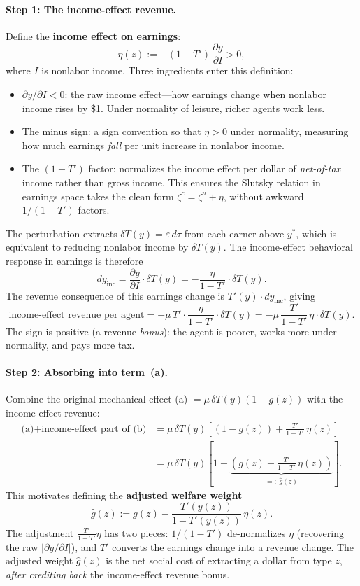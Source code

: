 \documentclass[12pt,a4paper]{article}
\theoremstyle{definition}
\theoremstyle{plain}
\theoremstyle{remark}
\begin{document}
\paragraph{Step 1: The income-effect revenue.}
Define the \textbf{income effect on earnings}:
\[
  \eta(z) := -(1-T')\,\frac{\partial y}{\partial I} > 0,
\]
where $I$ is nonlabor income. Three ingredients enter this definition:
\begin{itemize}[leftmargin=2em]
  \item $\partial y/\partial I < 0$: the raw income effect---how earnings change when nonlabor income rises by \$1. Under normality of leisure, richer agents work less.
  \item The minus sign: a sign convention so that $\eta > 0$ under normality, measuring how much earnings \emph{fall} per unit increase in nonlabor income.
  \item The $(1-T')$ factor: normalizes the income effect per dollar of \emph{net-of-tax} income rather than gross income. This ensures the Slutsky relation in earnings space takes the clean form $\zeta^c = \zeta^u + \eta$, without awkward $1/(1-T')$ factors.
\end{itemize} The perturbation extracts
$\delta T(y) = \varepsilon\,d\tau$ from each earner above
$y^*$, which is equivalent to reducing nonlabor income by
$\delta T(y)$. The income-effect behavioral response in
earnings is therefore
\[
  dy_{\text{inc}}
  = \frac{\partial y}{\partial I}\cdot\delta T(y)
  = -\frac{\eta}{1-T'}\cdot\delta T(y).
\]
The revenue consequence of this earnings change is
$T'(y)\cdot dy_{\text{inc}}$, giving
\[
  \text{income-effect revenue per agent}
  = -\mu\,T'\cdot\frac{\eta}{1-T'}\cdot\delta T(y)
  = -\mu\,\frac{T'}{1-T'}\,\eta\cdot\delta T(y).
\]
The sign is positive (a revenue \emph{bonus}): the agent is
poorer, works more under normality, and pays more tax.

\paragraph{Step 2: Absorbing into term~(a).}
Combine the original mechanical effect (a) $= \mu\,\delta T(y)(1-g(z))$
with the income-effect revenue:
\begin{align*}
  \text{(a)} + \text{income-effect part of (b)}
  &= \mu\,\delta T(y)\!\left[(1-g(z)) + \frac{T'}{1-T'}\,\eta(z)\right] \\
  &= \mu\,\delta T(y)\!\left[1 - \underbrace{\left(g(z) - \frac{T'}{1-T'}\,\eta(z)\right)}_{\displaystyle =:\;\hat g(z)}\right].
\end{align*}
This motivates defining the \textbf{adjusted welfare weight}
\begin{equation}
\label{eq:ghat-pert}
  \hat g(z) := g(z) - \frac{T'(y(z))}{1-T'(y(z))}\,\eta(z).
\end{equation}
The adjustment $\frac{T'}{1-T'}\eta$ has two pieces:
$1/(1-T')$ de-normalizes $\eta$ (recovering the raw
$|\partial y/\partial I|$), and $T'$ converts the earnings
change into a revenue change. The adjusted weight $\hat g(z)$
is the net social cost of extracting a dollar from type $z$,
\emph{after crediting back} the income-effect revenue bonus.
\end{document}
